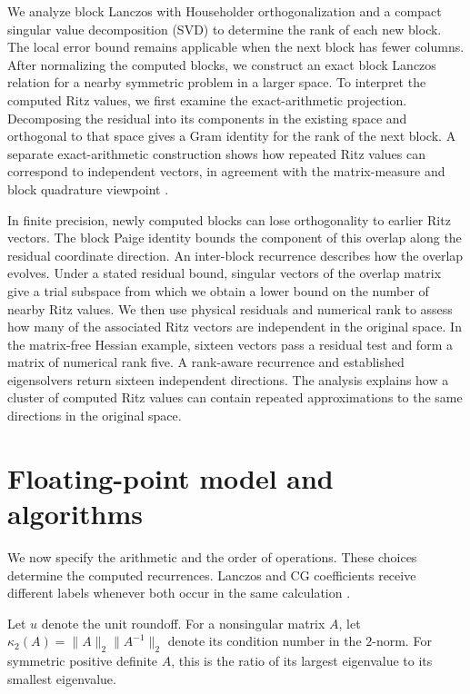 \documentclass[11pt]{article}
\theoremstyle{definition}
\begin{document}
We analyze block Lanczos with Householder orthogonalization and a compact
singular value decomposition (SVD) to determine the rank of each new block.
The local error bound remains applicable when the next block has fewer
columns. After normalizing the computed blocks, we construct an exact block
Lanczos relation for a nearby symmetric problem in a larger space.
To interpret the computed Ritz values, we first examine the exact-arithmetic
projection. Decomposing the residual into its components in the existing
space and orthogonal to that space gives a Gram identity for the rank of
the next block. A separate exact-arithmetic construction shows how repeated
Ritz values can correspond to independent vectors, in agreement with the
matrix-measure and block quadrature viewpoint
\cite{GolubMeurant2010,FenuMartinReichelRodriguez2013}.

In finite precision, newly computed blocks can lose orthogonality to
earlier Ritz vectors. The block Paige identity bounds the component of
this overlap along the residual coordinate direction. An inter-block
recurrence describes how the overlap evolves. Under a stated residual
bound, singular vectors of the overlap matrix give a trial subspace from
which we obtain a lower bound on the number of nearby Ritz values.
We then use physical residuals and numerical rank to assess how many of
the associated Ritz vectors are independent in the original space.
In the matrix-free Hessian example, sixteen vectors pass a residual test
and form a matrix of numerical rank five. A rank-aware recurrence and
established eigensolvers return sixteen independent directions.
The analysis explains how a cluster of computed Ritz values can contain
repeated approximations to the same directions in the original space.

\section{Floating-point model and algorithms}
\label{sec:arithmetic-model}

We now specify the arithmetic and the order of operations. These choices
determine the computed recurrences. Lanczos and CG coefficients receive
different labels whenever both occur in the same calculation
\cite[p.~200]{Saad2003}.

Let $u$ denote the unit roundoff. For a nonsingular matrix $A$, let
$\kappa_2(A)=\|A\|_2\|A^{-1}\|_2$ denote its condition number in the $2$-norm.
For symmetric positive definite $A$, this is the ratio of its largest
eigenvalue to its smallest eigenvalue.
\end{document}
